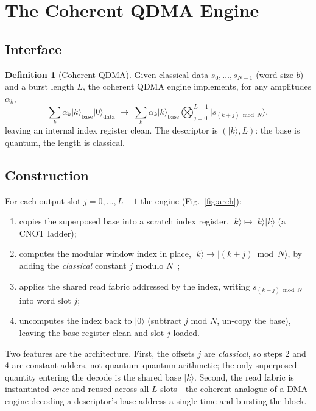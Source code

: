 \documentclass[11pt]{article}
\theoremstyle{definition}
\newtheorem{definition}{Definition}
\begin{document}
\section{The Coherent QDMA Engine}
\label{sec:arch}

\subsection{Interface}
\begin{definition}[Coherent QDMA]
Given classical data $s_0,\dots,s_{N-1}$ (word size $b$) and a burst length $L$,
the coherent QDMA engine implements, for any amplitudes $\alpha_k$,
\[
  \sum_k \alpha_k \lvert k\rangle_{\mathrm{base}}\lvert 0\rangle_{\mathrm{data}}
  \;\longrightarrow\;
  \sum_k \alpha_k \lvert k\rangle_{\mathrm{base}}
  \bigotimes_{j=0}^{L-1}\lvert s_{(k+j)\bmod N}\rangle ,
\]
leaving an internal index register clean. The descriptor is $(\lvert
k\rangle,L)$: the base is quantum, the length is classical.
\end{definition}

\subsection{Construction}
For each output slot $j=0,\dots,L-1$ the engine (Fig.~\ref{fig:arch}):
\begin{enumerate}
  \item copies the superposed base into a scratch index register,
  $\lvert k\rangle\!\mapsto\!\lvert k\rangle\lvert k\rangle$ (a CNOT ladder);
  \item computes the modular window index in place,
  $\lvert k\rangle\to\lvert (k+j)\bmod N\rangle$, by adding the \emph{classical}
  constant $j$ modulo $N$~\cite{draper2000adder,vedral1996arithmetic};
  \item applies the shared read fabric addressed by the index, writing
  $s_{(k+j)\bmod N}$ into word slot $j$;
  \item uncomputes the index back to $\lvert 0\rangle$ (subtract $j$ mod $N$,
  un-copy the base), leaving the base register clean and slot $j$ loaded.
\end{enumerate}
Two features are the architecture. First, the offsets $j$ are \emph{classical}, so
steps 2 and 4 are constant adders, not quantum--quantum arithmetic; the only
superposed quantity entering the decode is the shared base $\lvert k\rangle$.
Second, the read fabric is instantiated \emph{once} and reused across all $L$
slots---the coherent analogue of a DMA engine decoding a descriptor's base address
a single time and bursting the block.
\end{document}
